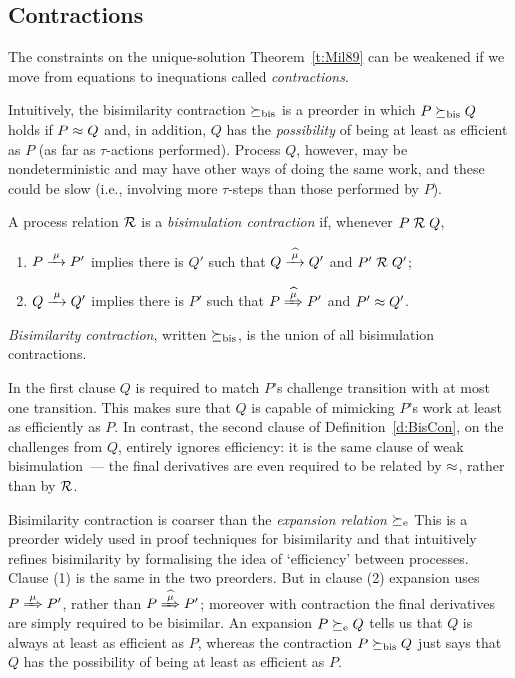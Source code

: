 \subsection{Contractions}
\label{s:mcontr}

The constraints on the unique-solution Theorem~\ref{t:Mil89} can be 
weakened if  we move from equations to inequations called
  \emph{contractions}.


  Intuitively,
  the bisimilarity contraction 
$\mathrel{\succeq_{\rm{bis}}}$ 
 is  a preorder in which 
$P \mathrel{\succeq_{\rm{bis}}} Q  $  holds  if $P \approx Q$ and, in addition, 
$Q$ has the \emph{possibility} of being at least as efficient as $P$ (as far as
$\tau$-actions performed). 
Process $Q$, however, may be nondeterministic and may have other ways
of doing the same work, and these could be  slow (i.e., involving
more $\tau$-steps than those performed by $P$).


\begin{definition}
\label{d:BisCon}
A process relation ${{\cal R}}$ 
 is a {\em  bisimulation  contraction}  if, whenever
 $P\mathrel{\cal R} Q$, %


\begin{enumerate}

\item   $P \arr\mu P'$ implies there is $Q'$ such that $Q \arcap \mu
  Q'$
 and $P' \mathrel{\cal R} Q'$;

\item 
    $Q \arr\mu Q'$   implies there is $P'$ such that $P \Arcap \mu
 P'$ and $P' 
\approx Q'$.
\end{enumerate}
\emph{Bisimilarity  contraction}, written $\mathrel{\succeq_{\rm{bis}}}$, is the union
of all bisimulation contractions. 
\end{definition}

In the first clause $Q$ is required to match $P$'s challenge
transition with at most one transition.
This makes sure that $Q$ is capable of mimicking $P$'s
work at least as efficiently as $P$. 
In contrast, the second clause of Definition~\ref{d:BisCon}, on the
challenges from $Q$, entirely ignores efficiency: it is the same
clause of  weak bisimulation~--- the final derivatives are even required
to be related  by $\approx$, rather than by ${\cal R}$.
 

Bisimilarity  contraction is coarser than 
 the \emph{expansion  relation} 
$\mathrel{\succeq_{\rm{e}}}$ \cite{sangiorgi2015equations} %
This is a
preorder widely used in proof techniques for bisimilarity and that 
intuitively refines bisimilarity by 
 formalising the idea of `efficiency' between processes.
Clause (1) is the same in the two
preorders. But in clause (2) expansion uses 
$P \Arr \mu P'$, rather than $P \Arcap \mu P'$; 
 moreover with
contraction the final derivatives are simply required to be bisimilar.
An expansion 
$P \mathrel{\succeq_{\rm{e}}} Q$
tells us  that $Q$ is always at least as efficient as $P$, whereas  the
 contraction $P \mathrel{\succeq_{\rm{bis}}} Q$  just says that $Q$ has the  possibility of
being at least as efficient as $P$. 

